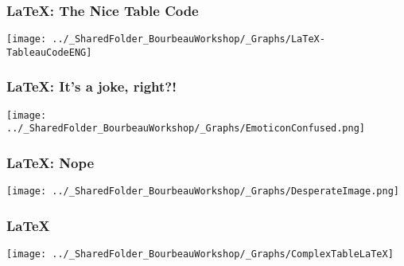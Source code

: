 \documentclass{beamer}
\begin{document}
    \begin{frame}
        \frametitle{\LaTeX: The Nice Table Code} \vspace{1cm}   
        \begin{center}
           \texttt{[image: ../\_SharedFolder\_BourbeauWorkshop/\_Graphs/LaTeX-TableauCodeENG]}
        \end{center}  
    \end{frame}
    
    \begin{frame}
        \frametitle{\LaTeX: It's a joke, right?!} \vspace{1cm}   
        \begin{center}
           \texttt{[image: ../\_SharedFolder\_BourbeauWorkshop/\_Graphs/EmoticonConfused.png]}
        \end{center}  
    \end{frame}
    
    \begin{frame}
        \frametitle{\LaTeX: Nope} \vspace{1cm}   
        \begin{center}
           \texttt{[image: ../\_SharedFolder\_BourbeauWorkshop/\_Graphs/DesperateImage.png]}
        \end{center}  
    \end{frame}
    
    \begin{frame}
        \frametitle{\LaTeX} \vspace{1cm}   
        \begin{center}
           \texttt{[image: ../\_SharedFolder\_BourbeauWorkshop/\_Graphs/ComplexTableLaTeX]}
        \end{center}  
    \end{frame}
    
\end{document}
